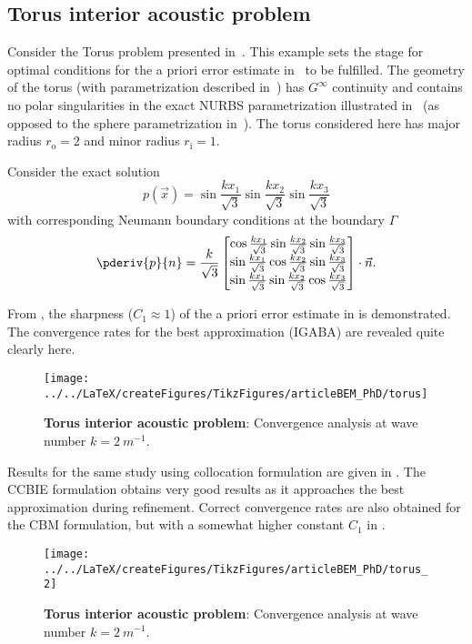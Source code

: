 \subsection{Torus interior acoustic problem}
Consider the Torus problem presented in~\cite{Simpson2014aib}. This example sets the stage for optimal conditions for the a priori error estimate in~ to be fulfilled. The geometry of the torus (with parametrization described in~) has $G^\infty$ continuity and contains no polar singularities in the exact NURBS parametrization illustrated in~ (as opposed to the sphere parametrization in~). The torus considered here has major radius $r_{\mathrm{o}} = 2$ and minor radius $r_{\mathrm{i}}=1$. 

Consider the exact solution
\begin{equation*}
	p(\vec{x}) = \sin\frac{kx_1}{\sqrt{3}}\sin\frac{kx_2}{\sqrt{3}}\sin\frac{kx_3}{\sqrt{3}}
\end{equation*}
with corresponding Neumann boundary conditions at the boundary $\Gamma$
\begin{equation*}
	\pderiv{p}{n} = \frac{k}{\sqrt{3}}\begin{bmatrix}
	\cos\frac{kx_1}{\sqrt{3}}\sin\frac{kx_2}{\sqrt{3}}\sin\frac{kx_3}{\sqrt{3}}\\
	\sin\frac{kx_1}{\sqrt{3}}\cos\frac{kx_2}{\sqrt{3}}\sin\frac{kx_3}{\sqrt{3}}\\
	\sin\frac{kx_1}{\sqrt{3}}\sin\frac{kx_2}{\sqrt{3}}\cos\frac{kx_3}{\sqrt{3}}
	\end{bmatrix}\cdot\vec{n}.
\end{equation*}

From , the sharpness ($C_1 \approx 1$) of the a priori error estimate in  is demonstrated. The convergence rates for the best approximation (IGABA) are revealed quite clearly here. 
\begin{figure}
	\centering
	\texttt{[image: ../../LaTeX/createFigures/TikzFigures/articleBEM\_PhD/torus]}
	\caption{\textbf{Torus interior acoustic problem}: Convergence analysis at wave number ${k=\SI{2}{m^{-1}}}$.}
	\label{Fig3:torus}
\end{figure}

Results for the same study using collocation formulation are given in . The CCBIE formulation obtains very good results as it approaches the best approximation during refinement. Correct convergence rates are also obtained for the CBM formulation, but with a somewhat higher constant $C_1$ in .
\begin{figure}
	\centering
	\texttt{[image: ../../LaTeX/createFigures/TikzFigures/articleBEM\_PhD/torus\_2]}
	\caption{\textbf{Torus interior acoustic problem}: Convergence analysis at wave number ${k=\SI{2}{m^{-1}}}$.}
	\label{Fig3:torus_2}
\end{figure}

